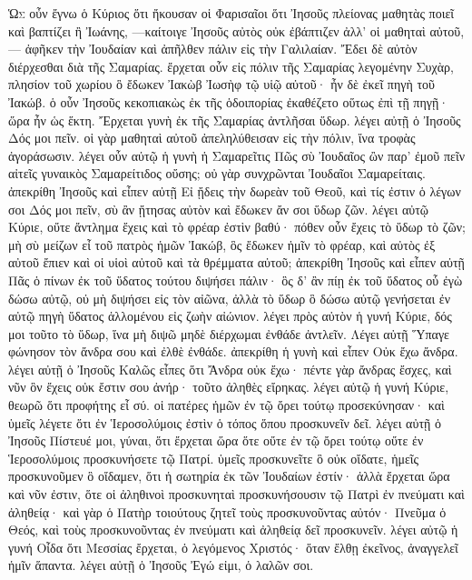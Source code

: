 \begin{pages}
    \begin{Rightside}
        \beginnumbering
		\renewcommand{\LettrineFontHook}{\PHtitl}
		\lettrine[lines=3]{Ὡ}{ς} οὖν ἔγνω ὁ Κύριος ὅτι ἤκουσαν οἱ Φαρισαῖοι ὅτι Ἰησοῦς πλείονας μαθητὰς ποιεῖ καὶ βαπτίζει ἢ Ἰωάνης, —καίτοιγε Ἰησοῦς αὐτὸς οὐκ ἐβάπτιζεν ἀλλ’ οἱ μαθηταὶ αὐτοῦ, — ἀφῆκεν τὴν Ἰουδαίαν καὶ ἀπῆλθεν πάλιν εἰς τὴν Γαλιλαίαν. Ἔδει δὲ αὐτὸν διέρχεσθαι διὰ τῆς Σαμαρίας. ἔρχεται οὖν εἰς πόλιν τῆς Σαμαρίας λεγομένην Συχὰρ, πλησίον τοῦ χωρίου ὃ ἔδωκεν Ἰακὼβ Ἰωσὴφ τῷ υἱῷ αὐτοῦ· ἦν δὲ ἐκεῖ πηγὴ τοῦ Ἰακώβ. ὁ οὖν Ἰησοῦς κεκοπιακὼς ἐκ τῆς ὁδοιπορίας ἐκαθέζετο οὕτως ἐπὶ τῇ πηγῇ· ὥρα ἦν ὡς ἕκτη. 
		\pend
		\pstart
		Ἔρχεται γυνὴ ἐκ τῆς Σαμαρίας ἀντλῆσαι ὕδωρ. λέγει αὐτῇ ὁ Ἰησοῦς Δός μοι πεῖν. οἱ γὰρ μαθηταὶ αὐτοῦ ἀπεληλύθεισαν εἰς τὴν πόλιν, ἵνα τροφὰς ἀγοράσωσιν. λέγει οὖν αὐτῷ ἡ γυνὴ ἡ Σαμαρεῖτις Πῶς σὺ Ἰουδαῖος ὢν παρ’ ἐμοῦ πεῖν αἰτεῖς γυναικὸς Σαμαρείτιδος οὔσης; οὐ γὰρ συνχρῶνται Ἰουδαῖοι Σαμαρείταις. ἀπεκρίθη Ἰησοῦς καὶ εἶπεν αὐτῇ Εἰ ᾔδεις τὴν δωρεὰν τοῦ Θεοῦ, καὶ τίς ἐστιν ὁ λέγων σοι Δός μοι πεῖν, σὺ ἂν ᾔτησας αὐτὸν καὶ ἔδωκεν ἄν σοι ὕδωρ ζῶν. λέγει αὐτῷ Κύριε, οὔτε ἄντλημα ἔχεις καὶ τὸ φρέαρ ἐστὶν βαθύ· πόθεν οὖν ἔχεις τὸ ὕδωρ τὸ ζῶν; μὴ σὺ μείζων εἶ τοῦ πατρὸς ἡμῶν Ἰακώβ, ὃς ἔδωκεν ἡμῖν τὸ φρέαρ, καὶ αὐτὸς ἐξ αὐτοῦ ἔπιεν καὶ οἱ υἱοὶ αὐτοῦ καὶ τὰ θρέμματα αὐτοῦ; ἀπεκρίθη Ἰησοῦς καὶ εἶπεν αὐτῇ Πᾶς ὁ πίνων ἐκ τοῦ ὕδατος τούτου διψήσει πάλιν· ὃς δ’ ἂν πίῃ ἐκ τοῦ ὕδατος οὗ ἐγὼ δώσω αὐτῷ, οὐ μὴ διψήσει εἰς τὸν αἰῶνα, ἀλλὰ τὸ ὕδωρ ὃ δώσω αὐτῷ γενήσεται ἐν αὐτῷ πηγὴ ὕδατος ἁλλομένου εἰς ζωὴν αἰώνιον. λέγει πρὸς αὐτὸν ἡ γυνή Κύριε, δός μοι τοῦτο τὸ ὕδωρ, ἵνα μὴ διψῶ μηδὲ διέρχωμαι ἐνθάδε ἀντλεῖν. 
		\pend
		\pstart
		Λέγει αὐτῇ Ὕπαγε φώνησον τὸν ἄνδρα σου καὶ ἐλθὲ ἐνθάδε. ἀπεκρίθη ἡ γυνὴ καὶ εἶπεν Οὐκ ἔχω ἄνδρα. λέγει αὐτῇ ὁ Ἰησοῦς Καλῶς εἶπες ὅτι Ἄνδρα οὐκ ἔχω· πέντε γὰρ ἄνδρας ἔσχες, καὶ νῦν ὃν ἔχεις οὐκ ἔστιν σου ἀνήρ· τοῦτο ἀληθὲς εἴρηκας. λέγει αὐτῷ ἡ γυνή Κύριε, θεωρῶ ὅτι προφήτης εἶ σύ. οἱ πατέρες ἡμῶν ἐν τῷ ὄρει τούτῳ προσεκύνησαν· καὶ ὑμεῖς λέγετε ὅτι ἐν Ἱεροσολύμοις ἐστὶν ὁ τόπος ὅπου προσκυνεῖν δεῖ. λέγει αὐτῇ ὁ Ἰησοῦς Πίστευέ μοι, γύναι, ὅτι ἔρχεται ὥρα ὅτε οὔτε ἐν τῷ ὄρει τούτῳ οὔτε ἐν Ἱεροσολύμοις προσκυνήσετε τῷ Πατρί. ὑμεῖς προσκυνεῖτε ὃ οὐκ οἴδατε, ἡμεῖς προσκυνοῦμεν ὃ οἴδαμεν, ὅτι ἡ σωτηρία ἐκ τῶν Ἰουδαίων ἐστίν· ἀλλὰ ἔρχεται ὥρα καὶ νῦν ἐστιν, ὅτε οἱ ἀληθινοὶ προσκυνηταὶ προσκυνήσουσιν τῷ Πατρὶ ἐν πνεύματι καὶ ἀληθείᾳ· καὶ γὰρ ὁ Πατὴρ τοιούτους ζητεῖ τοὺς προσκυνοῦντας αὐτόν· Πνεῦμα ὁ Θεός, καὶ τοὺς προσκυνοῦντας ἐν πνεύματι καὶ ἀληθείᾳ δεῖ προσκυνεῖν. λέγει αὐτῷ ἡ γυνή Οἶδα ὅτι Μεσσίας ἔρχεται, ὁ λεγόμενος Χριστός· ὅταν ἔλθῃ ἐκεῖνος, ἀναγγελεῖ ἡμῖν ἅπαντα. λέγει αὐτῇ ὁ Ἰησοῦς Ἐγώ εἰμι, ὁ λαλῶν σοι. 

\end{Rightside}
\end{pages}
